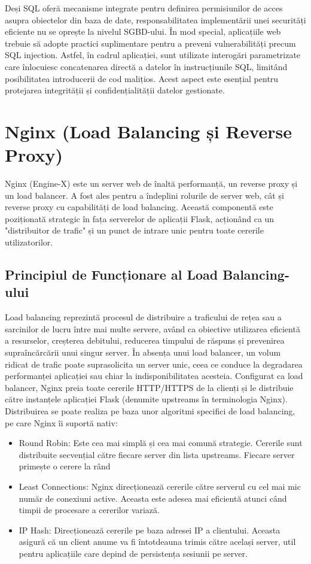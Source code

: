 \documentclass[12pt, a4paper, oneside, romanian]{teza-upb}
\begin{document}
Deși SQL \cite{sql} oferă mecanisme integrate pentru definirea permisiunilor de acces asupra obiectelor din baza de date, responsabilitatea implementării unei securități eficiente nu se oprește la nivelul SGBD-ului. În mod special, aplicațiile web trebuie să adopte practici suplimentare pentru a preveni vulnerabilități precum SQL injection. Astfel, în cadrul aplicației, sunt utilizate interogări parametrizate care înlocuiesc concatenarea directă a datelor în instrucțiunile SQL, limitând posibilitatea introducerii de cod malițios. Acest aspect este esențial pentru protejarea integrității și confidențialității datelor gestionate.


\section{Nginx (Load Balancing și Reverse Proxy)}\label{sec:nginx}
Nginx (Engine-X) \cite{ng}  este un server web de înaltă performanță, un reverse proxy și un load balancer. A fost ales pentru a îndeplini rolurile de server web, cât și reverse proxy cu capabilități de load balancing. Această componentă este poziționată strategic în fața serverelor de aplicații Flask, acționând ca un "distribuitor de trafic" și un punct de intrare unic pentru toate cererile utilizatorilor.
\subsection*{Principiul de Funcționare al Load Balancing-ului}
Load balancing reprezintă procesul de distribuire a traficului de rețea sau a sarcinilor de lucru între mai multe servere, având ca obiective utilizarea eficientă a resurselor, creșterea debitului, reducerea timpului de răspuns și prevenirea supraîncărcării unui singur server. În absența unui load balancer, un volum ridicat de trafic poate suprasolicita un server unic, ceea ce conduce la degradarea performanței aplicației sau chiar la indisponibilitatea acesteia. Configurat ca load balancer, Nginx preia toate cererile HTTP/HTTPS de la clienți și le distribuie către instanțele aplicației Flask (denumite upstreams în terminologia Nginx). Distribuirea se poate realiza pe baza unor algoritmi specifici de load balancing, pe care Nginx îi suportă nativ:
\begin{itemize}
	\item Round Robin: Este cea mai simplă și cea mai comună strategie. Cererile sunt distribuite secvențial către fiecare server din lista upstreams. Fiecare server primește o cerere la rând
	\item Least Connections: Nginx direcționează cererile către serverul cu cel mai mic număr de conexiuni active. Aceasta este adesea mai eficientă atunci când timpii de procesare a cererilor variază.
	\item IP Hash: Direcționează cererile pe baza adresei IP a clientului. Aceasta asigură că un client anume va fi întotdeauna trimis către același server, util pentru aplicațiile care depind de persistența sesiunii pe server. 
	
\end{itemize}
\end{document}
